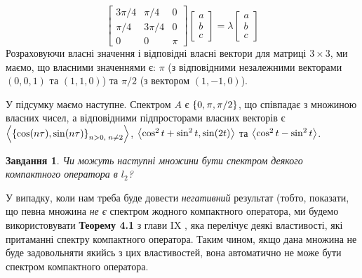 \documentclass[12pt]{article} %
\newtheorem{prob}{Завдання}
\begin{document}
\[\begin{bmatrix}
	3\pi/4&\pi/4&0\\\pi/4&3\pi/4&0\\0&0&\pi
\end{bmatrix}\begin{bmatrix}a\\b\\c\end{bmatrix}=\lambda\begin{bmatrix}a\\b\\c\end{bmatrix}\]
Розраховуючи власні значення і відповідні власні вектори для матриці $3\times3$, ми маємо, що власними значеннями є: 
$\pi$ (з відповідними незалежними векторами $(0,0,1)$ та $(1,1,0)$) та $\pi/2$ (з вектором $(1,-1,0)$).

У підсумку маємо наступне. Спектром $A$ є $\left\{0,\pi,\pi/2\right\}$, що співпадає з множиною власних чисел, а відповідними підпросторами власних
векторів є $\left<\left\{\cos(n\tau),\sin(n\tau)\right\}_{n>0,\;n\neq2}\right>$, $\left<\cos^2t+\sin^2t,\sin(2t)\right>$ та $\left<\cos^2t-\sin^2t\right>$.
\begin{prob}Чи можуть наступні множини бути спектром деякого компактного оператора в $l_2$?\end{prob}
	У випадку, коли нам треба буде довести \textit{негативний} результат (тобто, показати, що певна множина \textit{не є}
	спектром жодного компактного оператора, ми будемо використовувати \textbf{Теорему 4.1} з глави IX
	\cite{tb}, яка перелічує деякі властивості, які
	притаманні спектру компактного оператора. Таким чином, якщо дана множина не буде задовольняти якийсь з цих властивостей, вона автоматично
	не може бути спектром компактного оператора.
\end{document}
